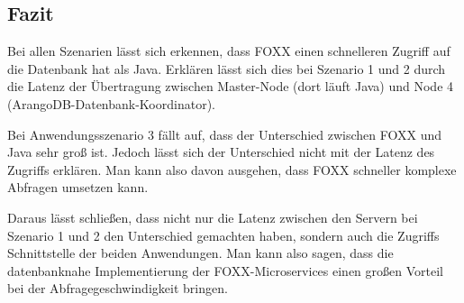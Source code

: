 
\subsection{Fazit}
Bei allen Szenarien lässt sich erkennen, dass FOXX einen schnelleren Zugriff auf die Datenbank hat als Java. Erklären lässt sich dies bei Szenario 1 und 2 durch die Latenz der Übertragung zwischen Master-Node (dort läuft Java) und Node 4 (ArangoDB-Datenbank-Koordinator).


Bei Anwendungsszenario 3 fällt auf, dass der Unterschied zwischen FOXX und Java sehr groß ist. Jedoch lässt sich der Unterschied nicht mit der Latenz des Zugriffs erklären. Man kann also davon ausgehen, dass FOXX schneller komplexe Abfragen umsetzen kann.


Daraus lässt schließen, dass nicht nur die Latenz zwischen den Servern bei Szenario 1 und 2 den Unterschied gemachten haben, sondern auch die Zugriffs Schnittstelle der beiden Anwendungen. Man kann also sagen, dass die datenbanknahe Implementierung der FOXX-Microservices einen großen Vorteil bei der Abfragegeschwindigkeit bringen.